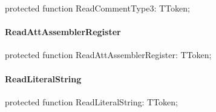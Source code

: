 \documentclass{report}
\newif\ifpdf
\begin{document}
\label{PasDoc_Tokenizer.TTokenizer-ReadCommentType3}
\begin{list}{}{
\setlength{\itemindent}{0cm}
\setlength{\listparindent}{0cm}
\setlength{\leftmargin}{\evensidemargin}
\addtolength{\leftmargin}{\tmplength}
\settowidth{\labelsep}{X}
\addtolength{\leftmargin}{\labelsep}
\setlength{\labelwidth}{\tmplength}
}
\item[\textbf{Declaration}\hfill]
\ifpdf
\begin{flushleft}
\fi
\begin{ttfamily}
protected function ReadCommentType3: TToken;\end{ttfamily}

\ifpdf
\end{flushleft}
\fi

\end{list}
\paragraph*{ReadAttAssemblerRegister}\hspace*{\fill}

\label{PasDoc_Tokenizer.TTokenizer-ReadAttAssemblerRegister}
\begin{list}{}{
\setlength{\itemindent}{0cm}
\setlength{\listparindent}{0cm}
\setlength{\leftmargin}{\evensidemargin}
\addtolength{\leftmargin}{\tmplength}
\settowidth{\labelsep}{X}
\addtolength{\leftmargin}{\labelsep}
\setlength{\labelwidth}{\tmplength}
}
\item[\textbf{Declaration}\hfill]
\ifpdf
\begin{flushleft}
\fi
\begin{ttfamily}
protected function ReadAttAssemblerRegister: TToken;\end{ttfamily}

\ifpdf
\end{flushleft}
\fi

\end{list}
\paragraph*{ReadLiteralString}\hspace*{\fill}

\label{PasDoc_Tokenizer.TTokenizer-ReadLiteralString}
\begin{list}{}{
\setlength{\itemindent}{0cm}
\setlength{\listparindent}{0cm}
\setlength{\leftmargin}{\evensidemargin}
\addtolength{\leftmargin}{\tmplength}
\settowidth{\labelsep}{X}
\addtolength{\leftmargin}{\labelsep}
\setlength{\labelwidth}{\tmplength}
}
\item[\textbf{Declaration}\hfill]
\ifpdf
\begin{flushleft}
\fi
\begin{ttfamily}
protected function ReadLiteralString: TToken;\end{ttfamily}

\ifpdf
\end{flushleft}
\fi

\end{list}
\end{document}
